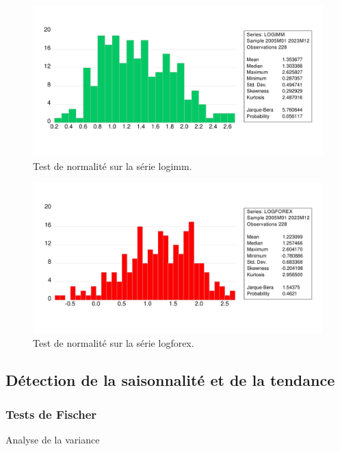 \begin{figure}[H]
    \centering
    \includegraphics[width=1\linewidth]{annexes/jb_logimm.pdf}
    \caption{Test de normalité sur la série logimm.}
    \label{fig:normalitelogimm}
\end{figure}

\begin{figure}[H]
    \centering
    \includegraphics[width=1\linewidth]{annexes/jb_logforex.pdf}
    \caption{Test de normalité sur la série logforex.}
    \label{fig:normalitelogforex}
\end{figure}

\subsection{Détection de la saisonnalité et de la tendance}

\subsubsection*{Tests de Fischer}\label{appendix:fischer_test}

\begin{table}[H]
    \centering
    \caption[test]{Analyse de la variance}
    \sffamily 
    \resizebox{\textwidth}{!}{}
    \label{tab:anova}
\end{table}

